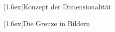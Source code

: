 \documentclass[final]{beamer}
\newlength{\columnheight}
\newlength{\marginw}
\newlength{\tw}
\newlength{\colsep}
\newlength{\colw}
\newenvironment{myTwoColPoster}{%
  \begin{minipage}[t]{\textwidth}%
    \hspace*{\marginw}%
    \hspace*{9.5bp}%
    \begin{minipage}[t]{\tw}}%
  {\end{minipage}%
   \hspace*{\marginw}%
   \end{minipage}}
\newenvironment{myCol}%
    {\begin{minipage}[t][\columnheight][t]{\colw}}%
    {\end{minipage}}
\newenvironment{textblock}[1]%
    {\begin{block}{\rule[-0.6ex]{0pt}{2.4ex}\raisebox{-0.25ex}[1.6ex]{#1}}%
     \vspace*{5mm}}%
    {\vspace*{5mm}\end{block}}
\begin{document}
\begin{frame}[t]{}
\begin{myTwoColPoster}
\begin{myCol}
\begin{textblock}{Konzept der Dimensionalit\"at}
  \end{textblock}

  

\end{myCol}
\hfill
\begin{myCol}
  

  \begin{textblock}{Die Grenze in Bildern}


\end{textblock}
\end{myCol}
\end{myTwoColPoster}
\end{frame}
\end{document}
